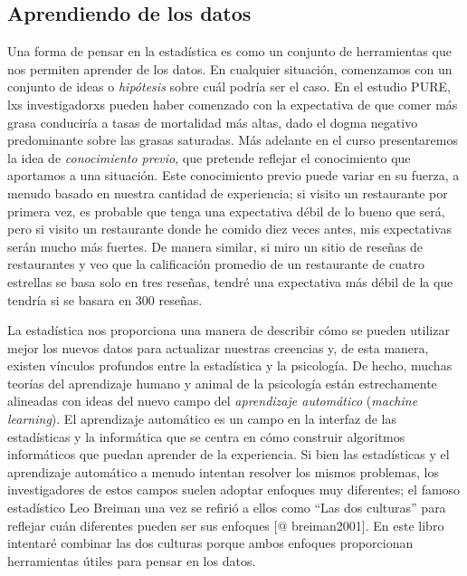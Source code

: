 \documentclass[
  12pt,
]{book}
\begin{document}
\hypertarget{aprendiendo-de-los-datos}{%
\subsection{Aprendiendo de los datos}\label{aprendiendo-de-los-datos}}

Una forma de pensar en la estadística es como un conjunto de herramientas que nos permiten aprender de los datos. En cualquier situación, comenzamos con un conjunto de ideas o \emph{hipótesis} sobre cuál podría ser el caso. En el estudio PURE, lxs investigadorxs pueden haber comenzado con la expectativa de que comer más grasa conduciría a tasas de mortalidad más altas, dado el dogma negativo predominante sobre las grasas saturadas. Más adelante en el curso presentaremos la idea de \emph{conocimiento previo}, que pretende reflejar el conocimiento que aportamos a una situación. Este conocimiento previo puede variar en su fuerza, a menudo basado en nuestra cantidad de experiencia; si visito un restaurante por primera vez, es probable que tenga una expectativa débil de lo bueno que será, pero si visito un restaurante donde he comido diez veces antes, mis expectativas serán mucho más fuertes. De manera similar, si miro un sitio de reseñas de restaurantes y veo que la calificación promedio de un restaurante de cuatro estrellas se basa solo en tres reseñas, tendré una expectativa más débil de la que tendría si se basara en 300 reseñas.

La estadística nos proporciona una manera de describir cómo se pueden utilizar mejor los nuevos datos para actualizar nuestras creencias y, de esta manera, existen vínculos profundos entre la estadística y la psicología. De hecho, muchas teorías del aprendizaje humano y animal de la psicología están estrechamente alineadas con ideas del nuevo campo del \emph{aprendizaje automático} (\emph{machine learning}). El aprendizaje automático es un campo en la interfaz de las estadísticas y la informática que se centra en cómo construir algoritmos informáticos que puedan aprender de la experiencia. Si bien las estadísticas y el aprendizaje automático a menudo intentan resolver los mismos problemas, los investigadores de estos campos suelen adoptar enfoques muy diferentes; el famoso estadístico Leo Breiman una vez se refirió a ellos como ``Las dos culturas'' para reflejar cuán diferentes pueden ser sus enfoques {[}@ breiman2001{]}. En este libro intentaré combinar las dos culturas porque ambos enfoques proporcionan herramientas útiles para pensar en los datos.
\end{document}
